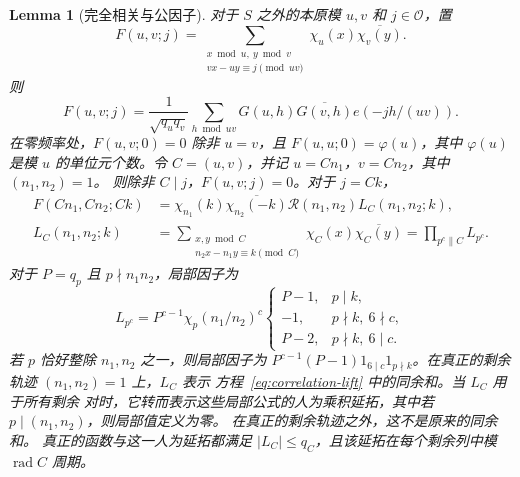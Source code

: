 \documentclass[11pt,a4paper]{article}
\numberwithin{equation}{section}
\numberwithin{figure}{section}
\newtheorem{lemma}[theorem]{Lemma}
\theoremstyle{definition}
\theoremstyle{remark}
\begin{document}
\begin{lemma}[完全相关与公因子]\label{lem:full-correlation}
对于 $S$ 之外的本原模 $u,v$ 和 $j\in\mathcal O$，置
\begin{equation}
 F(u,v;j)
 =\sum_{\substack{x\bmod u,\ y\bmod v\\
                    vx-uy\equiv j\pmod{uv}}}
       \chi_u(x)\overline{\chi_v(y)}.
 \label{old-eq:2.11}
\end{equation}
则
\[
 F(u,v;j)=\frac1{\sqrt{q_uq_v}}\sum_{h\bmod uv}
 G(u,h)\overline{G(v,h)}e(-jh/(uv)).
\]
在零频率处，$F(u,v;0)=0$ 除非 $u=v$，且
$F(u,u;0)=\varphi(u)$，其中 $\varphi(u)$ 是模 $u$ 的单位元个数。令 $C=(u,v)$，并记 $u=Cn_1$，$v=Cn_2$，其中 $(n_1,n_2)=1$。
则除非 $C\mid j$，$F(u,v;j)=0$。对于 $j=Ck$，
\begin{equation}
 \begin{aligned}
 F(Cn_1,Cn_2;Ck)
 &=\chi_{n_1}(k)\overline{\chi_{n_2}(-k)}
      \mathcal R(n_1,n_2)L_C(n_1,n_2;k),\\
 L_C(n_1,n_2;k)
 &=\sum_{\substack{x,y\bmod C\\n_2x-n_1y\equiv k\pmod C}}
       \chi_C(x)\overline{\chi_C(y)}
   =\prod_{p^c\parallel C}L_{p^c}.
 \end{aligned}
 \label{eq:correlation-lift}
\end{equation}
对于 $P=q_p$ 且 $p\nmid n_1n_2$，局部因子为
\begin{equation}
 L_{p^c}=P^{c-1}\chi_p(n_1/n_2)^c
 \begin{cases}
 P-1,&p\mid k,\\
 -1,&p\nmid k,\ 6\nmid c,\\
 P-2,&p\nmid k,\ 6\mid c.
 \end{cases}
 \label{eq:correlation-local}
\end{equation}
若 $p$ 恰好整除 $n_1,n_2$ 之一，则局部因子为
$P^{c-1}(P-1)1_{6\mid c}1_{p\nmid k}$。在真正的剩余轨迹
$(n_1,n_2)=1$ 上，$L_C$ 表示
方程~\eqref{eq:correlation-lift} 中的同余和。当 $L_C$ 用于所有剩余
对时，它转而表示这些局部公式的人为乘积延拓，其中若 $p\mid(n_1,n_2)$，则局部值定义为零。
在真正的剩余轨迹之外，这不是原来的同余和。
真正的函数与这一人为延拓都满足
$|L_C|\le q_C$，且该延拓在每个剩余列中模
$\operatorname{rad}C$ 周期。
\end{lemma}
\end{document}
